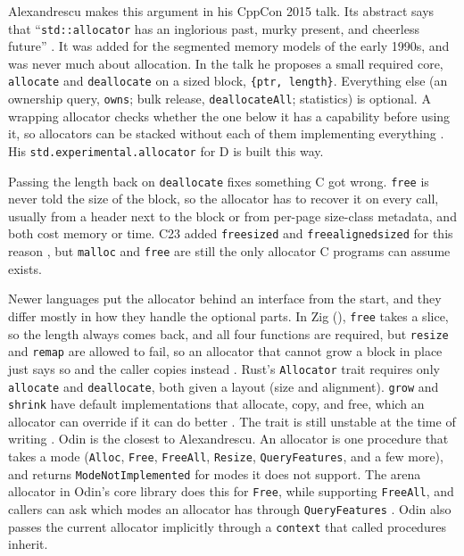 \documentclass[12pt]{report}
\newcommand{\fullref}[1]{\Cref{#1}}
\renewcommand{\_}{\origunderscore\allowbreak}
\begin{document}
Alexandrescu makes this argument in his CppCon 2015 talk. Its abstract says that ``\texttt{std::allocator} has an inglorious past, murky present, and cheerless future'' \cite{alexandrescu-allocator-vexation-abstract}. It was added for the segmented memory models of the early 1990s, and was never much about allocation. In the talk he proposes a small required core, \texttt{allocate} and \texttt{deallocate} on a sized block, \texttt{\{ptr, length\}}. Everything else (an ownership query, \texttt{owns}; bulk release, \texttt{deallocateAll}; statistics) is optional. A wrapping allocator checks whether the one below it has a capability before using it, so allocators can be stacked without each of them implementing everything \cite{alexandrescu-allocator-vexation}. His \texttt{std.experimental.allocator} for D is built this way.

Passing the length back on \texttt{deallocate} fixes something C got wrong. \texttt{free} is never told the size of the block, so the allocator has to recover it on every call, usually from a header next to the block or from per-page size-class metadata, and both cost memory or time. C23 added \texttt{free\_sized} and \texttt{free\_aligned\_sized} for this reason \cite{goldblatt2021sized}, but \texttt{malloc} and \texttt{free} are still the only allocator C programs can assume exists.

Newer languages put the allocator behind an interface from the start, and they differ mostly in how they handle the optional parts. In Zig (\fullref{sec:bg-languages}), \texttt{free} takes a slice, so the length always comes back, and all four functions are required, but \texttt{resize} and \texttt{remap} are allowed to fail, so an allocator that cannot grow a block in place just says so and the caller copies instead \cite{zig-allocator}. Rust's \texttt{Allocator} trait requires only \texttt{allocate} and \texttt{deallocate}, both given a layout (size and alignment). \texttt{grow} and \texttt{shrink} have default implementations that allocate, copy, and free, which an allocator can override if it can do better \cite{rust-allocator-trait}. The trait is still unstable at the time of writing \cite{rust-rfc-1398}. Odin is the closest to Alexandrescu. An allocator is one procedure that takes a mode (\texttt{Alloc}, \texttt{Free}, \texttt{Free\_All}, \texttt{Resize}, \texttt{Query\_Features}, and a few more), and returns \texttt{Mode\_Not\_Implemented} for modes it does not support. The arena allocator in Odin's core library does this for \texttt{Free}, while supporting \texttt{Free\_All}, and callers can ask which modes an allocator has through \texttt{Query\_Features} \cite{odin-allocator}. Odin also passes the current allocator implicitly through a \texttt{context} that called procedures inherit.
\end{document}
